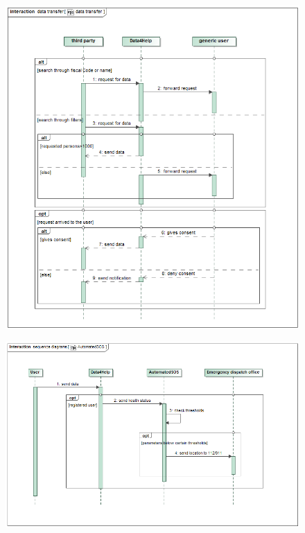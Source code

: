 \begin{figure}[h!] \ContinuedFloat
\centering
\includegraphics[scale=0.5]{sections/diagrams/data_transfer.png} \newline
{}
\end{figure}
\clearpage

\begin{figure}[h!] \ContinuedFloat
\centering
\includegraphics[scale=0.5]{sections/diagrams/AutomatedSOS.png} \newline
{}
\end{figure}
\clearpage

